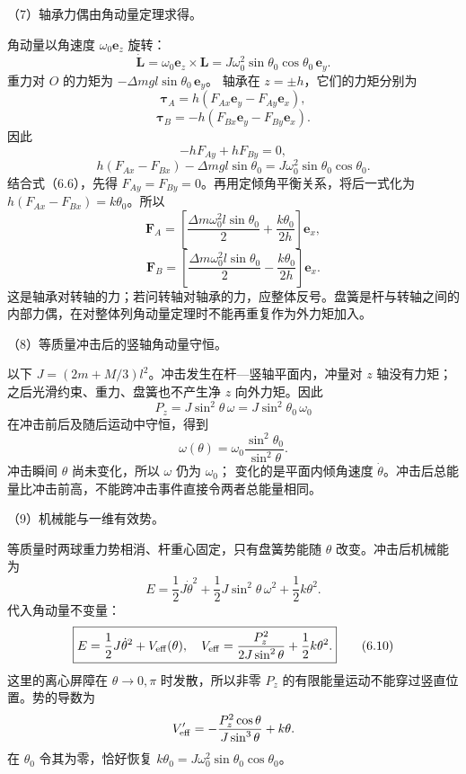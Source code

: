 \documentclass[12pt,a4paper,fontset=fandol]{ctexart}
\begin{document}
（7）轴承力偶由角动量定理求得。

角动量以角速度 \(\omega_0\mathbf e_z\) 旋转： \[
\dot{\mathbf L}
=\omega_0\mathbf e_z\times\mathbf L
=J\omega_0^2\sin\theta_0\cos\theta_0\,\mathbf e_y.
\] 重力对 \(O\) 的力矩为 \(-\Delta mgl\sin\theta_0\,\mathbf e_y\)。
轴承在 \(z=\pm h\)，它们的力矩分别为 \[
\boldsymbol\tau_A=h(F_{Ax}\mathbf e_y-F_{Ay}\mathbf e_x),
\] \[
\boldsymbol\tau_B=-h(F_{Bx}\mathbf e_y-F_{By}\mathbf e_x).
\] 因此 \[
-hF_{Ay}+hF_{By}=0,
\] \[
h(F_{Ax}-F_{Bx})-\Delta mgl\sin\theta_0
=J\omega_0^2\sin\theta_0\cos\theta_0.
\] 结合式（6.6），先得
\(F_{Ay}=F_{By}=0\)。再用定倾角平衡关系，将后一式化为
\(h(F_{Ax}-F_{Bx})=k\theta_0\)。所以 \[
\boxed{\mathbf F_A=
\left[\frac{\Delta m\omega_0^2l\sin\theta_0}{2}
+\frac{k\theta_0}{2h}\right]\mathbf e_x,}\tag{6.7}
\] \[
\boxed{\mathbf F_B=
\left[\frac{\Delta m\omega_0^2l\sin\theta_0}{2}
-\frac{k\theta_0}{2h}\right]\mathbf e_x.}\tag{6.8}
\]
这是轴承对转轴的力；若问转轴对轴承的力，应整体反号。盘簧是杆与转轴之间的内部力偶，在对整体列角动量定理时不能再重复作为外力矩加入。

（8）等质量冲击后的竖轴角动量守恒。

以下 \(J=(2m+M/3)l^2\)。冲击发生在杆---竖轴平面内，冲量对 \(z\)
轴没有力矩；之后光滑约束、重力、盘簧也不产生净 \(z\) 向外力矩。因此 \[
P_z=J\sin^2\theta\,\omega
=J\sin^2\theta_0\,\omega_0
\] 在冲击前后及随后运动中守恒，得到 \[
\boxed{\omega(\theta)=
\omega_0\frac{\sin^2\theta_0}{\sin^2\theta}.}\tag{6.9}
\] 冲击瞬间 \(\theta\) 尚未变化，所以 \(\omega\) 仍为 \(\omega_0\)；
变化的是平面内倾角速度
\(\dot\theta\)。冲击后总能量比冲击前高，不能跨冲击事件直接令两者总能量相同。

（9）机械能与一维有效势。

等质量时两球重力势相消、杆重心固定，只有盘簧势能随 \(\theta\)
改变。冲击后机械能为 \[
E=\frac12J\dot\theta^2+\frac12J\sin^2\theta\,\omega^2
+\frac12k\theta^2.
\] 代入角动量不变量： \[
\boxed{E=\frac12J\dot\theta^2+V_{\rm eff}(\theta),
\quad V_{\rm eff}=\frac{P_z^2}{2J\sin^2\theta}
+\frac12k\theta^2.}\tag{6.10}
\] 这里的离心屏障在 \(\theta\to0,\pi\) 时发散，所以非零 \(P_z\)
的有限能量运动不能穿过竖直位置。势的导数为 \[
V_{\rm eff}'=-\frac{P_z^2\cos\theta}{J\sin^3\theta}+k\theta.
\] 在 \(\theta_0\) 令其为零，恰好恢复
\(k\theta_0=J\omega_0^2\sin\theta_0\cos\theta_0\)。
\end{document}
